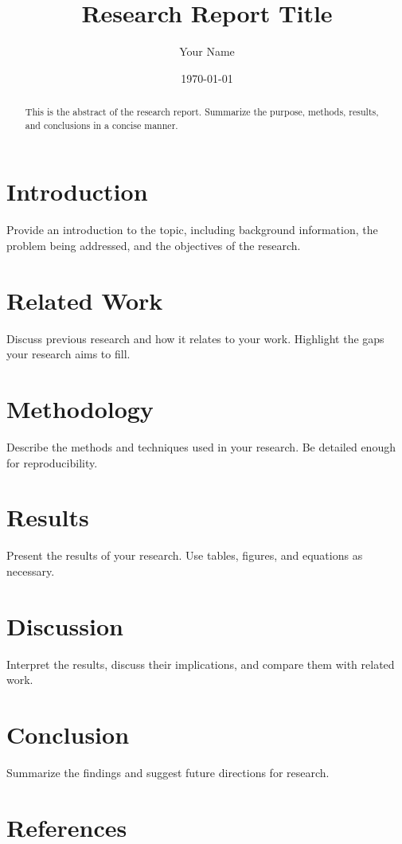 \documentclass[12pt]{article}
\title{Research Report Title}
\author{Your Name}
\date{\today}
\begin{document}
\maketitle

\begin{abstract}
This is the abstract of the research report. Summarize the purpose, methods, results, and conclusions in a concise manner.
\end{abstract}

\section{Introduction}
Provide an introduction to the topic, including background information, the problem being addressed, and the objectives of the research.

\section{Related Work}
Discuss previous research and how it relates to your work. Highlight the gaps your research aims to fill.

\section{Methodology}
Describe the methods and techniques used in your research. Be detailed enough for reproducibility.

\section{Results}
Present the results of your research. Use tables, figures, and equations as necessary.

\section{Discussion}
Interpret the results, discuss their implications, and compare them with related work.

\section{Conclusion}
Summarize the findings and suggest future directions for research.

\section*{References}


\end{document}

